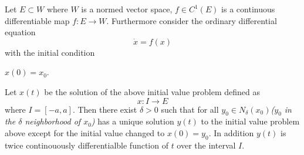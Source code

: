 \documentclass[12pt]{article}
\begin{document}
Let $E\subset W$ where $W$ is a normed vector space, $f\in C^1(E)$ is a continuous differentiable map $f: E \to W$. Furthermore consider the ordinary differential equation
$$\dot{x} = f(x)$$
with the initial condition
\begin{center}
$x(0) = x_0$.
\end{center}
Let $x(t)$ be the solution of the above initial value problem defined as
$$x:I \to E$$
where $I = [-a,a]$.  Then there exist $\delta >0$ such that for all $y_0 \in N_\delta (x_0)$\textit{($y_0$ in the $\delta$ neighborhood of $x_0$)} has a unique solution $y(t)$ to the initial value problem above except for the initial value changed to $x(0)=y_0$.  In addition $y(t)$ is twice continouously differentialble function of $t$ over the interval $I$.
\end{document}
